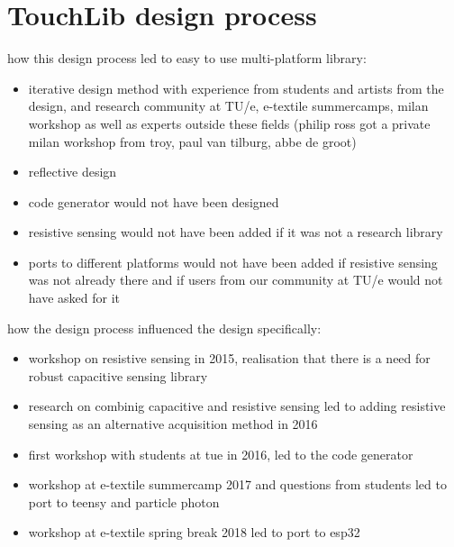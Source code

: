 \documentclass[format=sigchi, screen=true, review=true]{acmart}
\begin{document}
\section{TouchLib design process}
how this design process led to easy to use multi-platform library:
\begin{itemize}
	\item iterative design method with experience from students and artists from the design, and research community at TU/e, e-textile summercamps, milan workshop as well as experts outside these fields (philip ross got a private milan workshop from troy, paul van tilburg, abbe de groot)
	\item reflective design
	\item code generator would not have been designed
	\item resistive sensing would not have been added if it was not a research library
	\item ports to different platforms would not have been added if resistive sensing was not already there and if users from our community at TU/e would not have asked for it
\end{itemize}

how the design process influenced the design specifically:
\begin{itemize}
	\item workshop on resistive sensing in 2015, realisation that there is a need for robust capacitive sensing library
	\item research on combinig capacitive and resistive sensing led to adding resistive sensing as an alternative acquisition method in 2016
	\item first workshop with students at tue in 2016, led to the code generator
	\item workshop at e-textile summercamp 2017 and questions from students led to port to teensy and particle photon
	\item workshop at e-textile spring break 2018 led to port to esp32
\end{itemize}
\end{document}
